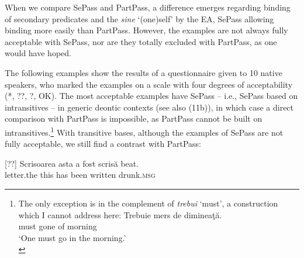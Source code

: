 \documentclass[output=paper]{langsci/langscibook}
\begin{document}
When we compare SePass and PartPass, a difference emerges regarding binding of secondary predicates and the  \textit{sine} ‘(one)self’ by the EA, SePass allowing binding more easily than PartPass. However, the examples are not always fully acceptable with SePass, nor are they totally excluded with PartPass, as one would have hoped.
 
The following examples show the results of a questionnaire given to 10 native speakers, who marked the examples on a scale with four degrees of acceptability (*, ??, ?, OK). The most acceptable examples have  SePass – i.e., SePass based on intransitives – in generic deontic contexts (see also (11b)), in which case a direct comparison with PartPass is impossible, as PartPass cannot be built on intransitives.\footnote{The only exception is in the complement of \textit{trebui} ‘must’, a construction which I cannot address here:
\ea \gll  Trebuie mers de dimineaţă.\\
    must     gone  of morning\\
    \glt ‘One must go in the morning.’\\
    \z} With transitive bases, although the examples of SePass are not fully acceptable, we still find a contrast with PartPass:

\settowidth{}
\ea%
    \label{ex:giurgea:41}
    \begin{xlista}
[??]{
    \gll Scrisoarea asta a    fost   scrisă   beat.        \\
         letter.the   this has been written drunk.\textsc{msg}\\}
\end{xlista}
\z
\end{document}
